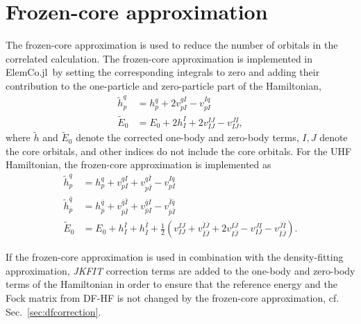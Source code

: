 \documentclass[a4paper,12pt,oneside]{book}
\newcommand{\half}{\frac{1}{2}}
\newcommand{\sect}[1]{Sec.~\ref{#1}}
\newcommand{\spa}[1]{{#1}}
\newcommand{\spb}[1]{\bar{#1}}
\newcommand{\elemcoil}{\textsf{ElemCo.jl}}
\begin{document}
\section{Frozen-core approximation}
\label{sec:frozen-core}
The frozen-core approximation is used to reduce the number of orbitals in the correlated 
calculation. The frozen-core approximation is implemented in \elemcoil\ by
setting the corresponding integrals to zero and adding their contribution to the
one-particle and zero-particle part of the Hamiltonian,
\begin{equation}
  \begin{aligned}
    \tilde h_p^q &= h_p^q + 2 v_{pI}^{qI} - v_{pI}^{Iq}\\
    \tilde E_0 &= E_0 + 2 h_I^I + 2 v_{IJ}^{IJ} - v_{IJ}^{JI},
  \end{aligned}
\end{equation}
where $\tilde h$ and $\tilde E_0$ denote the corrected one-body and zero-body terms, 
$I, J$ denote the core orbitals, and other indices do not include the core orbitals.
For the UHF Hamiltonian, the frozen-core approximation is implemented as
\begin{equation}
  \begin{aligned}
    \tilde h_{\spa p}^{\spa q} &= h_{\spa p}^{\spa q} + v_{\spa p \spa I}^{\spa q\spa I} + 
    v_{\spa p \spb I}^{\spa q\spb I} - v_{\spa p\spa I}^{\spa I\spa q}\\
    \tilde h_{\spb p}^{\spb q} &= h_{\spb p}^{\spb q} + v_{\spb p \spb I}^{\spb q\spb I} + 
    v_{\spb p \spa I}^{\spb q\spa I} - v_{\spb p\spb I}^{\spb I\spb q}\\
    \tilde E_0 &= E_0 + h_{\spa I}^{\spa I} + h_{\spb I}^{\spb I} + 
    \half\left(v_{\spa I\spa J}^{\spa I\spa J} + v_{\spb I\spb J}^{\spb I\spb J} 
    + 2 v_{\spa I\spb J}^{\spa I\spb J}
    - v_{\spa I\spa J}^{\spa J\spa I} - v_{\spb I\spb J}^{\spb J\spb I}
    \right).
  \end{aligned}
\end{equation}

If the frozen-core approximation is used in combination with the density-fitting approximation,
\textit{JKFIT} correction terms are added to the one-body and zero-body terms of the Hamiltonian in order to ensure that the
reference energy and the Fock matrix from DF-HF is not changed by the frozen-core approximation,
cf. \sect{sec:dfcorrection}.
\end{document}
